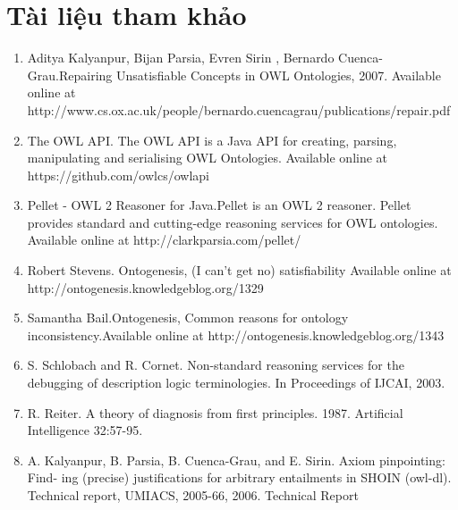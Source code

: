 \chapter{Tài liệu tham khảo}
\begin{enumerate}
\item 
Aditya Kalyanpur, Bijan Parsia, Evren Sirin
, Bernardo Cuenca-Grau.Repairing Unsatisfiable Concepts in OWL Ontologies, 2007. Available online at \\ http://www.cs.ox.ac.uk/people/bernardo.cuencagrau/publications/repair.pdf
\item
The OWL API. The OWL API is a Java API for creating, parsing, manipulating and serialising OWL Ontologies. Available online at
https://github.com/owlcs/owlapi
\item
Pellet - OWL 2 Reasoner for Java.Pellet is an OWL 2 reasoner. Pellet provides standard and cutting-edge reasoning services for OWL ontologies. Available online at http://clarkparsia.com/pellet/
\item 
Robert Stevens. Ontogenesis, (I can’t get no) satisfiability Available online at http://ontogenesis.knowledgeblog.org/1329
\item
Samantha Bail.Ontogenesis, Common reasons for ontology inconsistency.Available online at http://ontogenesis.knowledgeblog.org/1343
\item 
S. Schlobach and R. Cornet. Non-standard reasoning services for the debugging of description logic terminologies. In Proceedings of IJCAI, 2003.
\item
R. Reiter. A theory of diagnosis from first principles. 1987. Artificial Intelligence
32:57-95.
\item
A. Kalyanpur, B. Parsia, B. Cuenca-Grau, and E. Sirin. Axiom pinpointing: Find-
ing (precise) justifications for arbitrary entailments in SHOIN (owl-dl). Technical
report, UMIACS, 2005-66, 2006. Technical Report

\end{enumerate}


